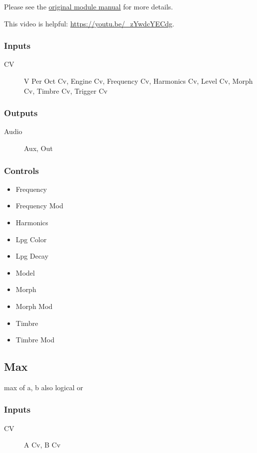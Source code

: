 Please see the \href{https://www.mutable-instruments.net/modules/plaits/manual/}{original module manual} for more details.

This video is helpful: \url{https://youtu.be/_zYwdcYECdg}.

\subsubsection{Inputs}
\begin{description}
\item [CV] V Per Oct Cv, Engine Cv, Frequency Cv, Harmonics Cv, Level Cv, Morph Cv, Timbre Cv, Trigger Cv
\end{description}

\subsubsection{Outputs}
\begin{description}
\item [Audio] Aux, Out
\end{description}

\subsubsection{Controls}
\begin{itemize}
\item Frequency
\item Frequency Mod
\item Harmonics
\item Lpg Color
\item Lpg Decay
\item Model
\item Morph
\item Morph Mod
\item Timbre
\item Timbre Mod
\end{itemize}

\subsection{Max}

max of a, b also logical or



\subsubsection{Inputs}
\begin{description}
\item [CV] A Cv, B Cv
\end{description}

